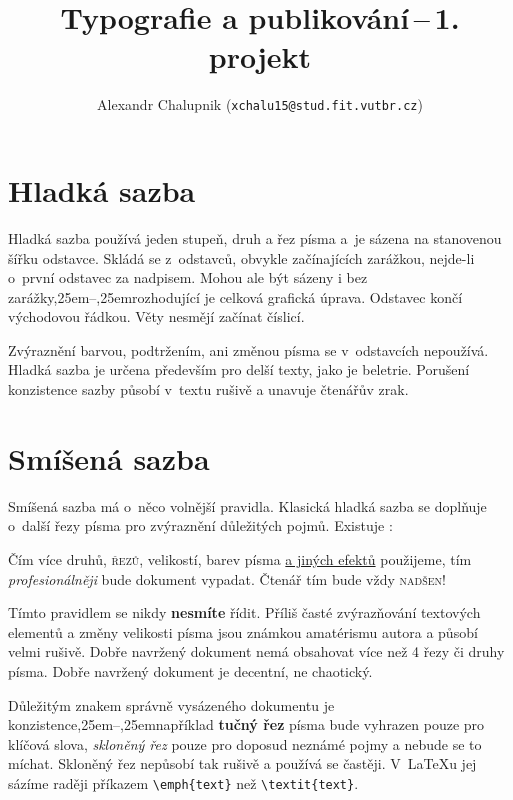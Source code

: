 \documentclass[10pt, a4paper,twocolumn]{article}
\title{Typografie a publikování\,--\,1. projekt}
\author{Alexandr Chalupnik (\texttt{xchalu15@stud.fit.vutbr.cz})}
\date{}
\def\,{\kern 0,25em}
\begin{document}
\maketitle

\section{Hladká sazba}

Hladká sazba používá jeden stupeň, druh a řez písma a~je sázena na stanovenou šířku odstavce. Skládá se z~odstavců, obvykle začínajících zarážkou, nejde-li o~první odstavec za nadpisem. Mohou ale být sázeny i bez zarážky\,--\,rozhodující je celková grafická úprava. Odstavec končí východovou řádkou. Věty nesmějí začínat číslicí.\par
Zvýraznění barvou, podtržením, ani změnou písma se v~odstavcích nepoužívá. Hladká sazba je určena především pro delší texty, jako je beletrie. Porušení konzistence sazby působí v~textu rušivě a unavuje čtenářův zrak.

\section{Smíšená sazba}

Smíšená sazba má o~něco volnější pravidla. Klasická hladká sazba se doplňuje o~další řezy písma pro zvýraznění důležitých pojmů. Existuje :

\bigskip
\begin{adjustwidth}{0.7cm}{0.7cm}
\quad
{ \selectfont Čím více druhů,} \textsc{řezů,} {\tiny velikostí}, 
barev písma \underline{a jiných efektů} použijeme, tím \emph{\large profesionálněji}  bude dokument vypadat. Čtenář tím bude vždy \textsc{nadšen}!
\end{adjustwidth}
\bigskip

{\footnotesize Tímto} pravidlem se nikdy \textbf{nesmíte} řídit. Příliš časté zvýrazňování textových elementů a změny velikosti {\fontsize{21}{25} \selectfont písma} jsou známkou amatérismu autora a působí {\fontsize{30}{36} \selectfont velmi} rušivě. Dobře navržený dokument nemá obsahovat více než 4 řezy či druhy písma. Dobře navržený dokument je decentní, ne chaotický.

Důležitým znakem správně vysázeného dokumentu je konzistence\,--\,například \textbf{tučný řez} písma bude vyhrazen pouze pro klíčová slova, \emph{skloněný řez} pouze pro doposud neznámé pojmy a nebude se to míchat. Skloněný řez nepůsobí tak rušivě a používá se častěji. V~\LaTeX u jej sázíme raději příkazem \verb|\emph{text}| než \verb|\textit{text}|.
\end{document}
